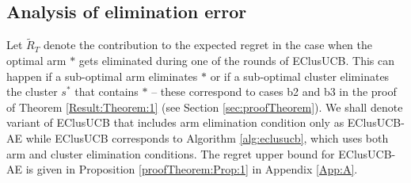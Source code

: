 % 
%
%
%
%
%
\vspace*{-1.7em}
\subsection*{Analysis of elimination error}
\vspace*{-0.4em}
Let $\widetilde R_T$ denote the contribution  to the expected regret in the case when the optimal arm $*$ gets eliminated during one of the rounds of EClusUCB. This can happen if a sub-optimal arm eliminates $*$ or if a sub-optimal cluster eliminates the cluster $s^*$ that contains $*$ -- these correspond to cases b2 and b3 in the proof of Theorem \ref{Result:Theorem:1} (see Section \ref{sec:proofTheorem}). 
We shall denote variant of EClusUCB that includes arm elimination condition only as EClusUCB-AE while EClusUCB corresponds to Algorithm \ref{alg:eclusucb}, which uses both arm and cluster elimination conditions. The regret upper bound for EClusUCB-AE is given in Proposition \ref{proofTheorem:Prop:1} in Appendix \ref{App:A}.

